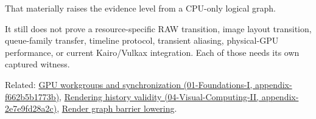 That materially raises the evidence level from a CPU-only logical graph.

It still does not prove a resource-specific RAW transition, image layout transition, queue-family transfer, timeline protocol, transient aliasing, physical-GPU performance, or current Kairo/Vulkax integration. Each of those needs its own captured witness.

Related: \href{../01-Foundations-I/main.pdf\#nameddest=appendix-f662b5b1773b}{GPU workgroups and synchronization (01-Foundations-I, appendix-f662b5b1773b)}, \href{../04-Visual-Computing-II/main.pdf\#nameddest=appendix-2e7e9fd28a2c}{Rendering history validity (04-Visual-Computing-II, appendix-2e7e9fd28a2c)}, \hyperref[appendix-0fc95374cb7e]{Render graph barrier lowering}.
